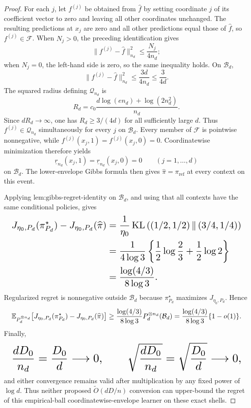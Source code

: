 \documentclass{article}
\begin{document}
\begin{proof}
For each \(j\), let \(f^{(j)}\) be obtained from \(\widehat f\) by setting coordinate \(j\) of its coefficient vector to zero and leaving all other coordinates unchanged. The resulting predictions at \(x_j\) are zero and all other predictions equal those of \(\widehat f\), so \(f^{(j)}\in\mathcal F\). When \(N_j>0\), the preceding identification gives
\[
\|f^{(j)}-\widehat f\|_{n_d}^2\le\frac{N_j}{4n_d};
\]
when \(N_j=0\), the left-hand side is zero, so the same inequality holds. On \(\mathcal B_d\),
\[
\|f^{(j)}-\widehat f\|_{n_d}^2\le\frac{3d}{4n_d}\le\frac{3}{4d}.
\]
The squared radius defining \(\mathcal Q_{n_d}\) is
\[
R_d=c_0\frac{d\log(en_d)+\log(2n_d^2)}{n_d}.
\]
Since \(dR_d\to\infty\), one has \(R_d\ge3/(4d)\) for all sufficiently large \(d\). Thus \(f^{(j)}\in\mathcal Q_{n_d}\) simultaneously for every \(j\) on \(\mathcal B_d\). Every member of \(\mathcal F\) is pointwise nonnegative, while \(f^{(j)}(x_j,1)=f^{(j)}(x_j,0)=0\). Coordinatewise minimization therefore yields
\[
\underline r_{n_d}(x_j,1)=\underline r_{n_d}(x_j,0)=0
\qquad(j=1,\ldots,d)
\]
on \(\mathcal B_d\). The lower-envelope Gibbs formula then gives \(\widehat\pi=\pi_{\mathrm{ref}}\) at every context on this event.

Applying \(\text{lem:gibbs-regret-identity}\) on \(\mathcal B_d\), and using that all contexts have the same conditional policies, gives
\[
\makebox[\linewidth][c]{\resizebox{0.98\linewidth}{!}{\(\displaystyle \begin{aligned}
J_{\eta_0,P_d}(\pi_{P_d}^\star)-J_{\eta_0,P_d}(\widehat\pi)
&=\frac1{\eta_0}\operatorname{KL}\left((1/2,1/2)\,\middle\Vert\,(3/4,1/4)\right)\\
&=\frac1{4\log3}\left\{\frac12\log\frac23+\frac12\log2\right\}\\
&=\frac{\log(4/3)}{8\log3}.
\end{aligned}\)}}
\]
Regularized regret is nonnegative outside \(\mathcal B_d\) because \(\pi_{P_d}^\star\) maximizes \(J_{\eta_0,P_d}\). Hence
\[
\makebox[\linewidth][c]{\resizebox{0.98\linewidth}{!}{\(\displaystyle \mathbb E_{P_d^{\otimes n_d}}\!\left[J_{\eta_0,P_d}(\pi_{P_d}^\star)-J_{\eta_0,P_d}(\widehat\pi)\right]
\ge\frac{\log(4/3)}{8\log3}P_d^{\otimes n_d}(\mathcal B_d)
=\frac{\log(4/3)}{8\log3}\{1-o(1)\}.\)}}
\]
Finally,
\[
\makebox[\linewidth][c]{\resizebox{0.98\linewidth}{!}{\(\displaystyle \frac{dD_0}{n_d}=\frac{D_0}{d}\longrightarrow0,
\qquad
\sqrt{\frac{dD_0}{n_d}}=\sqrt{\frac{D_0}{d}}\longrightarrow0,\)}}
\]
and either convergence remains valid after multiplication by any fixed power of \(\log d\). Thus neither proposed \(\widetilde O(dD/n)\) conversion can upper-bound the regret of this empirical-ball coordinatewise-envelope learner on these exact shells.
\end{proof}
\end{document}
